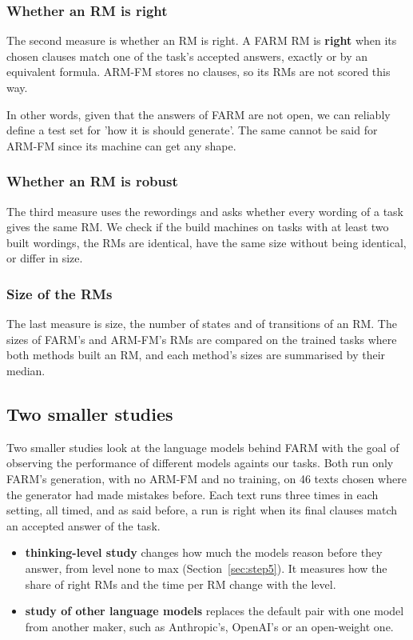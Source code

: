 \documentclass[11pt,english,listoffigures,listoftables]{tfgetsinf}
\begin{document}
\subsubsection{Whether an RM is right}
The second measure is whether an RM is right. A FARM RM is \textbf{right} when its chosen clauses match one of the task's accepted answers, exactly or by an equivalent formula. ARM-FM stores no clauses, so its RMs are not scored this way. 

In other words, given that the answers of FARM are not open, we can reliably define a test set for 'how it is should generate'. The same cannot be said for ARM-FM since its machine can get any shape.

\subsubsection{Whether an RM is robust}
The third measure uses the rewordings and asks whether every wording of a task gives the same RM. We check if the build machines on tasks with at least two built wordings, the RMs are identical, have the same size without being identical, or differ in size.

\subsubsection{Size of the RMs}
\label{sec:eval-size}The last measure is size, the number of states and of transitions of an RM. The sizes of FARM's and ARM-FM's RMs are compared on the trained tasks where both methods built an RM, and each method's sizes are summarised by their median.

\subsection{Two smaller studies}
Two smaller studies look at the language models behind FARM with the goal of observing the performance of different models againts our tasks. Both run only FARM's generation, with no ARM-FM and no training, on 46 texts chosen where the generator had made mistakes before. Each text runs three times in each setting, all timed, and as said before, a run is right when its final clauses match an accepted answer of the task.

\begin{itemize}
    \item \textbf{thinking-level study} changes how much the models reason before they answer, from level none to max (Section~\ref{sec:step5}). It measures how the share of right RMs and the time per RM change with the level.
    \item \textbf{study of other language models} replaces the default pair with one model from another maker, such as Anthropic's, OpenAI's or an open-weight one. 
\end{itemize}
\end{document}
